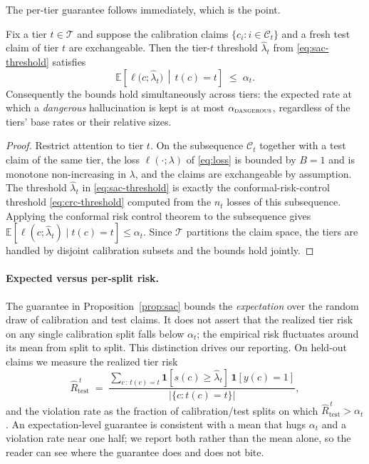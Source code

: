 The per-tier guarantee follows immediately, which is the point.

\begin{proposition}
\label{prop:sac}
Fix a tier $t \in \mathcal{T}$ and suppose the calibration claims
$\{c_i : i \in \mathcal{C}_t\}$ and a fresh test claim of tier $t$ are
exchangeable. Then the tier-$t$ threshold $\widehat{\lambda}_t$ from
\eqref{eq:sac-threshold} satisfies
\begin{equation}
\mathbb{E}\!\left[\ell\big(c; \widehat{\lambda}_t\big) \,\middle|\, t(c) = t\right]
\;\le\; \alpha_t .
\end{equation}
Consequently the bounds hold simultaneously across tiers: the expected rate at
which a \emph{dangerous} hallucination is kept is at most
$\alpha_{\textsc{dangerous}}$, regardless of the tiers' base rates or their
relative sizes.
\end{proposition}

\begin{proof}
Restrict attention to tier $t$. On the subsequence $\mathcal{C}_t$ together with a
test claim of the same tier, the loss $\ell(\cdot; \lambda)$ of \eqref{eq:loss} is
bounded by $B = 1$ and is monotone non-increasing in $\lambda$, and the claims are
exchangeable by assumption. The threshold $\widehat{\lambda}_t$ in
\eqref{eq:sac-threshold} is exactly the conformal-risk-control threshold
\eqref{eq:crc-threshold} computed from the $n_t$ losses of this subsequence.
Applying the conformal risk control theorem \citep{angelopoulos2024crc} to the
subsequence gives $\mathbb{E}[\ell(c; \widehat{\lambda}_t) \mid t(c) = t] \le
\alpha_t$. Since $\mathcal{T}$ partitions the claim space, the tiers are handled by
disjoint calibration subsets and the bounds hold jointly.
\end{proof}

\paragraph{Expected versus per-split risk.}
The guarantee in Proposition~\ref{prop:sac} bounds the \emph{expectation} over the
random draw of calibration and test claims. It does not assert that the realized
tier risk on any single calibration split falls below $\alpha_t$; the empirical
risk fluctuates around its mean from split to split. This distinction drives our
reporting. On held-out claims we measure the realized tier risk
\begin{equation}
\widehat{R}^{\,t}_{\text{test}} \;=\;
\frac{\sum_{c \,:\, t(c)=t} \mathbf{1}[s(c) \ge \widehat{\lambda}_t]\,
\mathbf{1}[y(c)=1]}{\big|\{c : t(c) = t\}\big|},
\label{eq:realized-risk}
\end{equation}
and the violation rate as the fraction of calibration/test splits on which
$\widehat{R}^{\,t}_{\text{test}} > \alpha_t$. An expectation-level guarantee is
consistent with a mean that hugs $\alpha_t$ and a violation rate near one half; we
report both rather than the mean alone, so the reader can see where the guarantee
does and does not bite.

